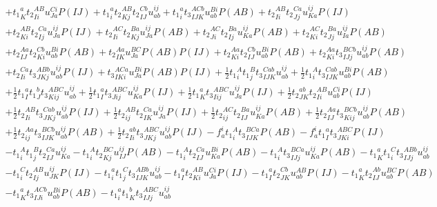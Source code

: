 \begin{gather*}
+ {t_1}^{a}_{K} {t_2}^{AB}_{Ii} u^{Ci}_{Ja} P(IJ)
+ {t_1}^{a}_{i} {t_2}^{AB}_{Kj} {t_2}^{Cb}_{IJ} u^{ij}_{ab}
+ {t_1}^{a}_{i} {t_3}^{ACb}_{IJK} u^{Bi}_{ab} P(AB)
+ {t_2}^{AB}_{Ii} {t_2}^{Ca}_{Jj} u^{ij}_{Ka} P(IJ) \\
+ {t_2}^{AB}_{Ki} {t_2}^{Ca}_{Ij} u^{ij}_{Ja} P(IJ)
+ {t_2}^{AC}_{Ii} {t_2}^{Ba}_{Kj} u^{ij}_{Ja} P(AB)
+ {t_2}^{AC}_{Ji} {t_2}^{Ba}_{Ij} u^{ij}_{Ka} P(AB)
+ {t_2}^{AC}_{Ki} {t_2}^{Ba}_{Jj} u^{ij}_{Ia} P(AB) \\
+ {t_2}^{Aa}_{IJ} {t_2}^{Cb}_{Ki} u^{Bi}_{ab} P(AB)
+ {t_2}^{Aa}_{IK} u^{BC}_{Ja} P(AB) P(IJ)
+ {t_2}^{Aa}_{Ki} {t_2}^{Cb}_{IJ} u^{Bi}_{ab} P(AB)
+ {t_2}^{Aa}_{Ki} {t_3}^{BCb}_{IJj} u^{ij}_{ab} P(AB) \\
+ {t_2}^{Ca}_{Ii} {t_3}^{ABb}_{JKj} u^{ij}_{ab} P(IJ)
+ {t_3}^{ACa}_{IKi} u^{Bi}_{Ja} P(AB) P(IJ)
+ \frac{1}{2}{t_1}^{A}_{i} {t_1}^{B}_{j} {t_3}^{Cab}_{IJK} u^{ij}_{ab}
+ \frac{1}{2}{t_1}^{A}_{i} {t_3}^{Cab}_{IJK} u^{Bi}_{ab} P(AB) \\
+ \frac{1}{2}{t_1}^{a}_{I} {t_1}^{b}_{J} {t_3}^{ABC}_{Kij} u^{ij}_{ab}
+ \frac{1}{2}{t_1}^{a}_{I} {t_3}^{ABC}_{Jij} u^{ij}_{Ka} P(IJ)
+ \frac{1}{2}{t_1}^{a}_{K} {t_3}^{ABC}_{Iij} u^{ij}_{Ja} P(IJ)
+ \frac{1}{2}{t_2}^{ab}_{JK} {t_2}^{AB}_{Ii} u^{Ci}_{ab} P(IJ) \\
+ \frac{1}{2}{t_2}^{AB}_{Ii} {t_3}^{Cab}_{JKj} u^{ij}_{ab} P(IJ)
+ \frac{1}{2}{t_2}^{AB}_{ij} {t_2}^{Ca}_{IK} u^{ij}_{Ja} P(IJ)
+ \frac{1}{2}{t_2}^{AC}_{ij} {t_2}^{Ba}_{IJ} u^{ij}_{Ka} P(AB)
+ \frac{1}{2}{t_2}^{Aa}_{IJ} {t_3}^{BCb}_{Kij} u^{ij}_{ab} P(AB) \\
+ \frac{1}{2}{t_2}^{Aa}_{ij} {t_3}^{BCb}_{IJK} u^{ij}_{ab} P(AB)
+ \frac{1}{2}{t_2}^{ab}_{Ii} {t_3}^{ABC}_{JKj} u^{ij}_{ab} P(IJ)
- f^{i}_{a} {t_1}^{A}_{i} {t_3}^{BCa}_{IJK} P(AB)
- f^{i}_{a} {t_1}^{a}_{I} {t_3}^{ABC}_{JKi} P(IJ) \\
- {t_1}^{A}_{i} {t_1}^{B}_{j} {t_2}^{Ca}_{IJ} u^{ij}_{Ka}
- {t_1}^{A}_{i} {t_2}^{BC}_{Kj} u^{ij}_{IJ} P(AB)
- {t_1}^{A}_{i} {t_2}^{Ca}_{IJ} u^{Bi}_{Ka} P(AB)
- {t_1}^{A}_{i} {t_3}^{BCa}_{IJj} u^{ij}_{Ka} P(AB)
- {t_1}^{a}_{K} {t_1}^{C}_{i} {t_3}^{ABb}_{IJj} u^{ij}_{ab} \\
- {t_1}^{C}_{i} {t_2}^{AB}_{Ij} u^{ij}_{JK} P(IJ)
- {t_1}^{a}_{i} {t_1}^{C}_{j} {t_3}^{ABb}_{IJK} u^{ij}_{ab}
- {t_1}^{a}_{I} {t_2}^{AB}_{Ki} u^{Ci}_{Ja} P(IJ)
- {t_1}^{a}_{I} {t_2}^{Cb}_{JK} u^{AB}_{ab} P(IJ)
- {t_1}^{a}_{K} {t_2}^{Ab}_{IJ} u^{BC}_{ab} P(AB) \\
- {t_1}^{a}_{K} {t_3}^{ACb}_{IJi} u^{Bi}_{ab} P(AB)
- {t_1}^{a}_{i} {t_1}^{b}_{K} {t_3}^{ABC}_{IJj} u^{ij}_{ab}

\end{gather*}
